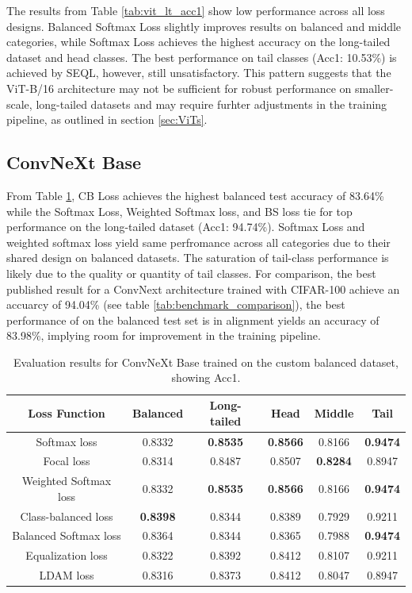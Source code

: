 The results from Table \ref{tab:vit_lt_acc1} show low performance across all loss designs. Balanced Softmax Loss slightly improves results on balanced and middle categories, while Softmax Loss achieves the highest accuracy on the long-tailed dataset and head classes. The best performance on tail classes (Acc1: 10.53\%) is achieved by SEQL, however, still unsatisfactory. This pattern suggests that the ViT-B/16 architecture may not be sufficient for robust performance on smaller-scale, long-tailed datasets and may require furhter adjustments in the training pipeline, as outlined in section \ref{sec:ViTs}. 

\subsection{ConvNeXt Base}
From Table \ref{tab:conv_bal_acc1_1}, CB Loss achieves the highest balanced test accuracy of 83.64\% while the Softmax Loss, Weighted Softmax loss, and BS loss tie for top performance on the long-tailed dataset (Acc1: 94.74\%). Softmax Loss and weighted softmax loss yield same perfromance across all categories due to their shared design on balanced datasets. The saturation of tail-class performance is likely due to the quality or quantity of tail classes. For comparison, the best published result for a ConvNext architecture trained with CIFAR-100 achieve an accuarcy of 94.04\% (see table \ref{tab:benchmark_comparison}), the best performance of on the balanced test set is in alignment yields an accuracy of 83.98\%, implying room for improvement in the training pipeline.

\begin{table}[h!]
    \centering
    \caption{Evaluation results for ConvNeXt Base trained on the custom balanced dataset, showing Acc1.}
    \small
    \begin{tabular}{cccccc}
        \toprule
        Loss Function & Balanced & Long-tailed & Head & Middle & Tail \\ 
        \midrule
        Softmax loss   & 0.8332 & \textbf{0.8535} & \textbf{0.8566} & 0.8166 & \textbf{0.9474} \\
        Focal loss   & 0.8314 & 0.8487 & 0.8507 & \textbf{0.8284} & 0.8947 \\
        Weighted Softmax loss   & 0.8332 & \textbf{0.8535} & \textbf{0.8566} &  0.8166 & \textbf{0.9474} \\
        Class-balanced loss   & \textbf{0.8398} & 0.8344 & 0.8389 & 0.7929 & 0.9211 \\
        Balanced Softmax loss   & 0.8364 & 0.8344 & 0.8365 & 0.7988 & \textbf{0.9474} \\
        Equalization loss   & 0.8322 & 0.8392 & 0.8412 & 0.8107 & 0.9211 \\
        LDAM loss   & 0.8316 & 0.8373 & 0.8412 & 0.8047 & 0.8947 \\
        \bottomrule
    \end{tabular}
    \label{tab:conv_bal_acc1_1}
\end{table}


